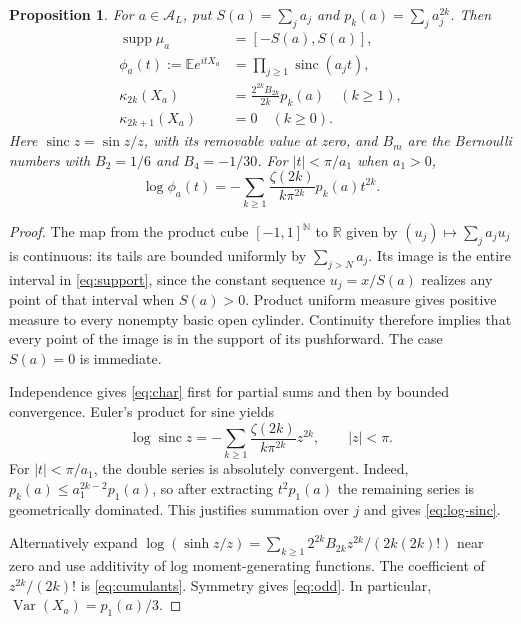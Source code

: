 \documentclass[11pt,a4paper]{article}
\newtheorem{proposition}[theorem]{Proposition}
\theoremstyle{definition}
\theoremstyle{remark}
\DeclareMathOperator{\Var}{Var}
\DeclareMathOperator{\supp}{supp}
\DeclareMathOperator{\sinc}{sinc}
\newcommand{\R}{\mathbb R}
\newcommand{\N}{\mathbb N}
\newcommand{\E}{\mathbb E}
\newcommand{\A}{\mathcal A}
\begin{document}
\begin{proposition}\label{prop:cumulants}
For $a\in\A_L$, put $S(a)=\sum_j a_j$ and $p_k(a)=\sum_j a_j^{2k}$.
Then
\begin{align}
 \supp\mu_a&=[-S(a),S(a)],                            \label{eq:support}\\
 \phi_a(t):=\E e^{itX_a}&=\prod_{j\ge1}\sinc(a_jt),  \label{eq:char}\\
 \kappa_{2k}(X_a)&=\frac{2^{2k}B_{2k}}{2k}p_k(a)
       \quad(k\ge1),                                \label{eq:cumulants}\\
 \kappa_{2k+1}(X_a)&=0\quad(k\ge0).                  \label{eq:odd}
\end{align}
Here $\sinc z=\sin z/z$, with its removable value at zero, and $B_m$
are the Bernoulli numbers with $B_2=1/6$ and $B_4=-1/30$.
For $|t|<\pi/a_1$ when $a_1>0$,
\begin{equation}\label{eq:log-sinc}
 \log\phi_a(t)
 =-\sum_{k\ge1}\frac{\zeta(2k)}{k\pi^{2k}}p_k(a)t^{2k}.
\end{equation}
\end{proposition}

\begin{proof}
The map from the product cube $[-1,1]^{\N}$ to $\R$ given by
$(u_j)\mapsto\sum_j a_ju_j$ is continuous: its tails are bounded uniformly
by $\sum_{j>N}a_j$. Its image is the entire interval in
\eqref{eq:support}, since the constant sequence $u_j=x/S(a)$ realizes any
point of that interval when $S(a)>0$. Product uniform measure gives positive
measure to every nonempty basic open cylinder. Continuity therefore implies
that every point of the image is in the support of its pushforward. The
case $S(a)=0$ is immediate.

Independence gives \eqref{eq:char} first for partial sums and then by
bounded convergence. Euler's product for sine yields
\[
 \log\sinc z=-\sum_{k\ge1}\frac{\zeta(2k)}{k\pi^{2k}}z^{2k},
                  \qquad |z|<\pi.
\]
For $|t|<\pi/a_1$, the double series is absolutely convergent. Indeed,
$p_k(a)\le a_1^{2k-2}p_1(a)$, so after extracting $t^2p_1(a)$ the
remaining series is geometrically dominated. This justifies summation over
$j$ and gives \eqref{eq:log-sinc}.

Alternatively expand
$\log(\sinh z/z)=\sum_{k\ge1}2^{2k}B_{2k}z^{2k}/(2k(2k)!)$
near zero and use additivity of log moment-generating functions. The
coefficient of $z^{2k}/(2k)!$ is \eqref{eq:cumulants}. Symmetry gives
\eqref{eq:odd}. In particular, $\Var(X_a)=p_1(a)/3$.
\end{proof}
\end{document}
